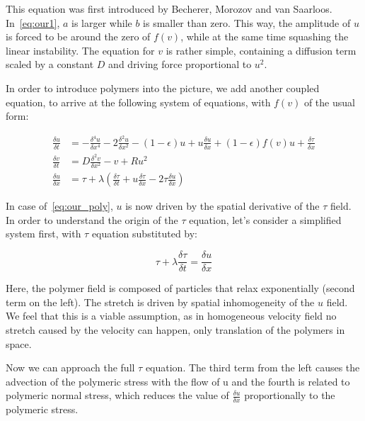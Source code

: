 \documentclass[11pt,a4paper]{article}
\begin{document}
This equation was first introduced by Becherer, Morozov and van Saarloos\cite{Morozov09}.
In~\eqref{eq:our1}, $a$ is larger while $b$ is smaller than zero.
This way, the amplitude of $u$ is forced to be around the zero of $f(v)$, while at the same time squashing the linear instability.
The equation for $v$ is rather simple, containing a diffusion term scaled by a constant $D$ and driving force proportional to $u^2$.

In order to introduce polymers into the picture, we add another coupled equation, to arrive at the following system of equations, with $f(v)$ of the usual form:


\begin{equation}\label{eq:our_poly}
    \begin{split}
        \frac{\delta u}{\delta t} &= -\frac{\delta^4u}{\delta x^4} - 2\frac{\delta^2u}{\delta x^2} - (1 - \epsilon)u + u\frac{\delta u}{\delta x} + (1 - \epsilon)f(v)u + \frac{\delta \tau}{\delta x}\\
        \frac{\delta v}{\delta t} &= D\frac{\delta^2 v}{\delta x^2} - v + Ru^2 \\
        \frac{\delta u}{\delta x} &= \tau + \lambda(\frac{\delta \tau}{\delta t} + u\frac{\delta \tau}{\delta x} - 2\tau\frac{\delta u}{\delta x})
\end{split}
\end{equation}

In case of~\eqref{eq:our_poly}, $u$ is now driven by the spatial derivative of the $\tau$ field.
In order to understand the origin of the $\tau$ equation, let's consider a simplified system first, with $\tau$ equation substituted by:

\begin{equation}\label{eq:poly_simp}
    \tau + \lambda\frac{\delta \tau}{\delta t} = \frac{\delta u}{\delta x}
\end{equation}

Here, the polymer field is composed of particles that relax exponentially (second term on the left).
The stretch is driven by spatial inhomogeneity of the $u$ field.
We feel that this is a viable assumption, as in homogeneous velocity field no stretch caused by the velocity can happen, only translation of the polymers in space.

Now we can approach the full $\tau$ equation.
The third term from the left causes the advection of the polymeric stress with the flow of u and the fourth is related to polymeric normal stress, which reduces the value of $\frac{\delta u}{\delta x}$ proportionally to the polymeric stress.
\end{document}
